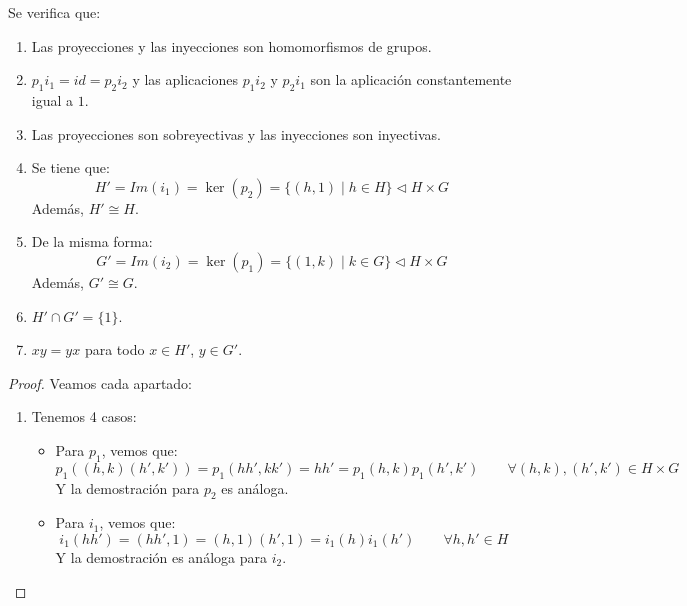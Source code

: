 \begin{prop}\label{prop:propiedades_proy_iny}
    Se verifica que:
    \begin{enumerate}
        \item Las proyecciones y las inyecciones son homomorfismos de grupos.
        \item $p_1i_1 = id = p_2i_2$ y las aplicaciones $p_1i_2$ y $p_2i_1$ son la aplicación constantemente igual a $1$.
        \item Las proyecciones son sobreyectivas y las inyecciones son inyectivas.
        \item Se tiene que:
            \begin{equation*}
                H' = Im(i_1) = \ker(p_2) = \{(h,1) \mid h\in H\} \lhd H\times G
            \end{equation*}
            Además, $H'\cong H$.
        \item De la misma forma:
            \begin{equation*}
                G' = Im(i_2) = \ker(p_1) = \{(1,k)\mid k\in G\} \lhd H\times G
            \end{equation*}
            Además, $G'\cong G$.
        \item $H'\cap G' = \{1\}$.
        \item $xy = yx$ para todo $x\in H'$, $y\in G'$.
    \end{enumerate}
    \begin{proof} 
        Veamos cada apartado:
        \begin{enumerate}
            \item Tenemos 4 casos:
                \begin{itemize}
                    \item Para $p_1$, vemos que:
                        \begin{equation*}
                            p_1((h,k)(h',k')) = p_1(hh',kk') = hh' = p_1(h,k)p_1(h',k') \qquad \forall (h,k),(h',k')\in H\times G
                        \end{equation*}
                        Y la demostración para $p_2$ es análoga.
                    \item Para $i_1$, vemos que:
                        \begin{equation*}
                            i_1(hh') = (hh',1) = (h,1)(h',1) = i_1(h)i_1(h') \qquad \forall h,h'\in H
                        \end{equation*}
                        Y la demostración es análoga para $i_2$.

\end{itemize}
\end{enumerate}
\end{proof}
\end{prop}
